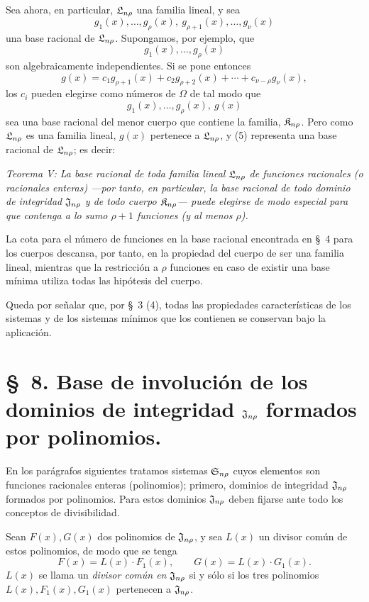 \documentclass[11pt]{article}
\begin{document}
Sea ahora, en particular, $\mathfrak{L}_{n\rho}$ una familia lineal, y sea
\begin{equation}
  g_1(x),\ldots,g_\rho(x),\ g_{\rho+1}(x),\ldots,g_\nu(x)
\tag{4}
\end{equation}
una base racional de $\mathfrak{L}_{n\rho}$. Supongamos, por ejemplo, que
\[
  g_1(x),\ldots,g_\rho(x)
\]
son algebraicamente independientes. Si se pone entonces
\[
  g(x)=c_1g_{\rho+1}(x)+c_2g_{\rho+2}(x)+\cdots+c_{\nu-\rho}g_\nu(x),
\]
los $c_i$ pueden elegirse como números de $\Omega$ de tal modo que
\begin{equation}
  g_1(x),\ldots,g_\rho(x),\ g(x)
\tag{5}
\end{equation}
sea una base racional del menor cuerpo que contiene la familia, $\mathfrak{K}_{n\rho}$. Pero como $\mathfrak{L}_{n\rho}$ es una familia lineal, $g(x)$ pertenece a $\mathfrak{L}_{n\rho}$, y (5) representa una base racional de $\mathfrak{L}_{n\rho}$; es decir:

\emph{Teorema V: La base racional de toda familia lineal $\mathfrak{L}_{n\rho}$ de funciones racionales (o racionales enteras) ---por tanto, en particular, la base racional de todo dominio de integridad $\mathfrak{J}_{n\rho}$ y de todo cuerpo $\mathfrak{K}_{n\rho}$--- puede elegirse de modo especial para que contenga a lo sumo $\rho+1$ funciones (y al menos $\rho$).}

La cota para el número de funciones en la base racional encontrada en \S\ 4 para los cuerpos descansa, por tanto, en la propiedad del cuerpo de ser una familia lineal, mientras que la restricción a $\rho$ funciones en caso de existir una base mínima utiliza todas las hipótesis del cuerpo.

Queda por señalar que, por \S\ 3 (4), todas las propiedades características de los sistemas y de los sistemas mínimos que los contienen se conservan bajo la aplicación.

\section*{\S\ 8. Base de involución de los dominios de integridad $\mathfrak{J}_{n\rho}$ formados por polinomios.}

En los parágrafos siguientes tratamos sistemas $\mathfrak{S}_{n\rho}$ cuyos elementos son funciones racionales enteras (polinomios); primero, dominios de integridad $\mathfrak{J}_{n\rho}$ formados por polinomios. Para estos dominios $\mathfrak{J}_{n\rho}$ deben fijarse ante todo los conceptos de divisibilidad.

Sean $F(x),G(x)$ dos polinomios de $\mathfrak{J}_{n\rho}$, y sea $L(x)$ un divisor común de estos polinomios, de modo que se tenga
\[
  F(x)=L(x)\cdot F_1(x),\qquad G(x)=L(x)\cdot G_1(x).
\]
$L(x)$ se llama un \emph{divisor común en $\mathfrak{J}_{n\rho}$} si y sólo si los tres polinomios $L(x),F_1(x),G_1(x)$ pertenecen a $\mathfrak{J}_{n\rho}$.
\end{document}
